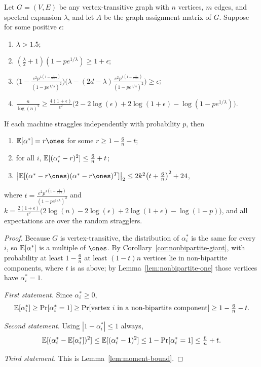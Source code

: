 \begin{theorem}
  \label{thm:random-main}
  Let $G = (V,E)$ be any vertex-transitive graph with $n$ vertices, $m$ edges,
  and spectral expansion $\lambda$, and let $A$ be the graph assignment matrix of
  $G$. Suppose for some positive $\epsilon$:
  \begin{enumerate}
    \item $\lambda > 1.5$;
    \item $(\tfrac{\lambda}{2}+1)(1 - p e^{1/\lambda}) \ge 1 + \epsilon$;
    \item $\Big(1 - \tfrac{e^2 p^{\lambda(1-\frac{1}{3+\epsilon})}}{(1-pe^{1/\lambda})^2}\Big)
      \Big(\lambda - (2d-\lambda)\tfrac{e^2 p^{\lambda(1-\frac{1}{3+\epsilon})}}{(1-pe^{1/\lambda})^2}\Big) \ge \epsilon$;
    \item $\tfrac{n}{\log(n)^2} \ge \tfrac{4(1+\epsilon)}{\epsilon^2}
      \big(2 - 2\log(\epsilon) + 2\log(1+\epsilon) - \log(1 - pe^{1/\lambda})\big)$.
  \end{enumerate}
  If each machine straggles independently with probability $p$, then
  \begin{enumerate}
    \item $\E[\alpha^*] = r\ones$ for some $r \ge 1 - \tfrac{6}{n} - t$;
    \item for all $i$, $\mathbb{E}[(\alpha^*_i - r)^2] \le \tfrac{6}{n} + t$;
    \item $\big|\E[(\alpha^* - r\ones)(\alpha^* - r\ones)^T]\big|_2
      \le 2k^2\big(t + \tfrac{6}{n}\big)^2 + 24$,
  \end{enumerate}
  where $t = \tfrac{e^2 p^{\lambda(1-\frac{1}{3+\epsilon})}}{(1-pe^{1/\lambda})^2}$
  and $k = \tfrac{2(1+\epsilon)}{\epsilon^2}
  \big(2\log(n) - 2\log(\epsilon) + 2\log(1+\epsilon) - \log(1-p)\big)$, and all
  expectations are over the random stragglers.
\end{theorem}
\begin{proof}
  Because $G$ is vertex-transitive, the distribution of $\alpha^*_i$ is the same
  for every $i$, so $\mathbb{E}[\alpha^*]$ is a multiple of $\ones$. By
  Corollary~\ref{cor:nonbipartite-giant}, with probability at least
  $1 - \tfrac{6}{n}$ at least $(1-t)n$ vertices lie in non-bipartite components,
  where $t$ is as above; by Lemma~\ref{lem:nonbipartite-one} those vertices have
  $\alpha^*_i = 1$.

  \emph{First statement.} Since $\alpha^*_i \ge 0$,
  \[
    \mathbb{E}[\alpha^*_i] \ge \Pr[\alpha^*_i = 1] \ge \Pr[\text{vertex } i
      \text{ in a non-bipartite component}] \ge 1 - \tfrac{6}{n} - t .
  \]

  \emph{Second statement.} Using $|1 - \alpha^*_i| \le 1$ always,
  \[
    \mathbb{E}[(\alpha^*_i - \mathbb{E}[\alpha^*_i])^2] \le \mathbb{E}[(\alpha^*_i - 1)^2]
      \le 1 - \Pr[\alpha^*_i = 1] \le \tfrac{6}{n} + t .
  \]

  \emph{Third statement.} This is Lemma~\ref{lem:moment-bound}.
\end{proof}

